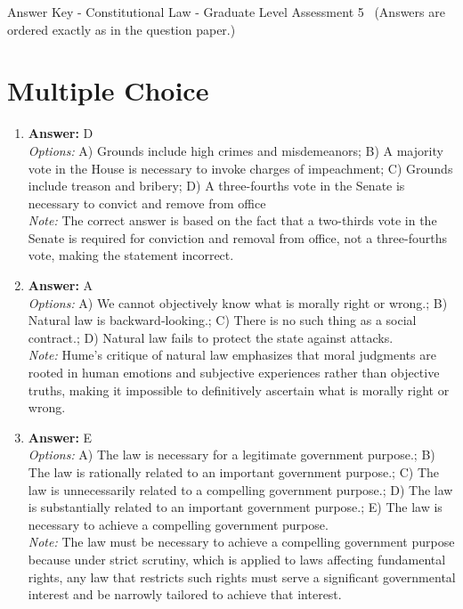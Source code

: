 \documentclass[12pt]{article}
\begin{document}
\begin{center}
Answer Key - Constitutional Law - Graduate Level Assessment 5 \
\small (Answers are ordered exactly as in the question paper.)
\end{center}

\section*{Multiple Choice}
\begin{enumerate}[label=\arabic*.]
\item \textbf{Answer:} D
\\ \textit{Options:} A) Grounds include high crimes and misdemeanors; B) A majority vote in the House is necessary to invoke charges of impeachment; C) Grounds include treason and bribery; D) A three-fourths vote in the Senate is necessary to convict and remove from office
\\ \textit{Note:} The correct answer is based on the fact that a two-thirds vote in the Senate is required for conviction and removal from office, not a three-fourths vote, making the statement incorrect.
\item \textbf{Answer:} A
\\ \textit{Options:} A) We cannot objectively know what is morally right or wrong.; B) Natural law is backward-looking.; C) There is no such thing as a social contract.; D) Natural law fails to protect the state against attacks.
\\ \textit{Note:} Hume's critique of natural law emphasizes that moral judgments are rooted in human emotions and subjective experiences rather than objective truths, making it impossible to definitively ascertain what is morally right or wrong.
\item \textbf{Answer:} E
\\ \textit{Options:} A) The law is necessary for a legitimate government purpose.; B) The law is rationally related to an important government purpose.; C) The law is unnecessarily related to a compelling government purpose.; D) The law is substantially related to an important government purpose.; E) The law is necessary to achieve a compelling government purpose.
\\ \textit{Note:} The law must be necessary to achieve a compelling government purpose because under strict scrutiny, which is applied to laws affecting fundamental rights, any law that restricts such rights must serve a significant governmental interest and be narrowly tailored to achieve that interest.

\end{enumerate}
\end{document}
